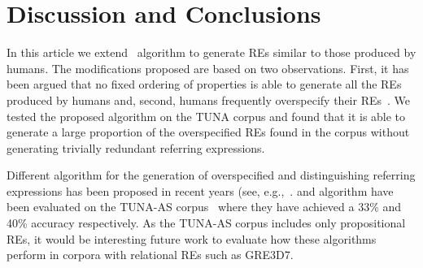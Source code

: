 \section{Discussion and Conclusions} 
\label{sec:discussion}

In this article we extend~\cite{arec2:2008:Areces} algorithm to generate REs similar to those produced by humans. The modifications 
proposed are based on two observations. First, it has been argued that no fixed ordering of properties is able to generate all the REs produced by humans and, second, humans frequently overspecify their REs~\cite{Engelhardt_Bailey_Ferreira_2006,Arts_Maes_Noordman_Jansen_2011}. 
We tested 
the proposed algorithm on the TUNA corpus and found that it is able to generate a large proportion of the overspecified REs found in the corpus without generating trivially redundant referring expressions.


Different algorithm for the generation of overspecified and distinguishing referring expressions has been proposed in recent years 
(see, e.g.,~\cite{delucena-paraboni:2008:ENLG,ruud-emiel-mariet:2012:INLG2012}.  
\cite{delucena-paraboni:2008:ENLG} and \cite{ruud-emiel-mariet:2012:INLG2012} algorithm
have been evaluated on the TUNA-AS corpus~\cite{gatt-balz-kow:2008:ENLG} where they have achieved a 33\% and 40\% accuracy respectively. 
As the TUNA-AS corpus includes only propositional REs, it would be interesting future work to evaluate how these algorithms perform in corpora with relational REs such as GRE3D7. 

